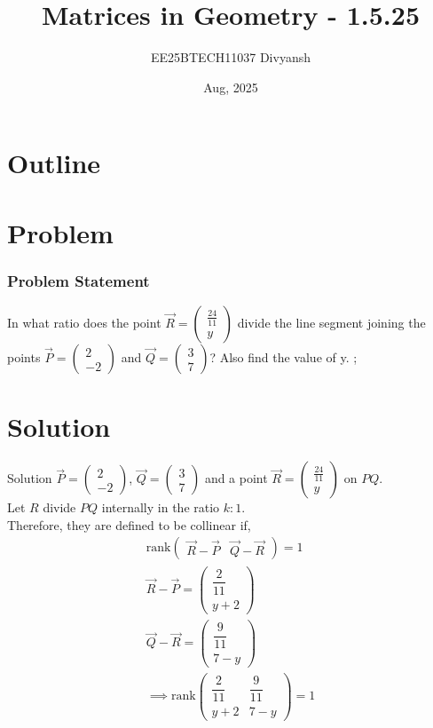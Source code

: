 \documentclass{beamer}
\title{Matrices in Geometry - 1.5.25}
\author{EE25BTECH11037  Divyansh}
\date{Aug, 2025}
\theoremstyle{remark}
\newcommand{\myvec}[1]{\ensuremath{\begin{pmatrix}#1\end{pmatrix}}}
\begin{document}
\maketitle

\section*{Outline}
\begin{frame}
\tableofcontents
\end{frame}
\section{Problem}
\begin{frame}
\frametitle{Problem Statement}
In what ratio does the point $\vec{R}=\myvec{\frac{24}{11} \\ y}$ divide the line segment joining the points $\vec{P}=\myvec{2 \\ -2}$ and $\vec{Q}=\myvec{3 \\ 7}$? Also find the value of y.
;\end{frame}

\section{Solution}
\begin{frame}{Solution}
   $\vec{P}=\myvec{2\\-2}$, $\vec{Q}=\myvec{3\\7}$ and a point $\vec{R}=  \myvec{\frac{24}{11} \\ y}$ on $PQ$. \\
   Let $R$ divide $PQ$ internally in the ratio $k:1$.\\
   Therefore, they are defined to be collinear if,
   \begin{align*}
    \text{rank}\myvec{\vec{R}- \vec{P} & \vec{Q}-\vec{R}}=1\\
    \vec{R}-\vec{P}=\myvec{\dfrac{2}{11} \\ y+2}\\
    \vec{Q}-\vec{R}=\myvec{\dfrac{9}{11} \\ 7-y}\\
    \implies \text{rank}\myvec{\dfrac{2}{11} & \dfrac{9}{11} \\ y+2 & 7-y} = 1
\end{align*}
\end{frame}
\end{document}
